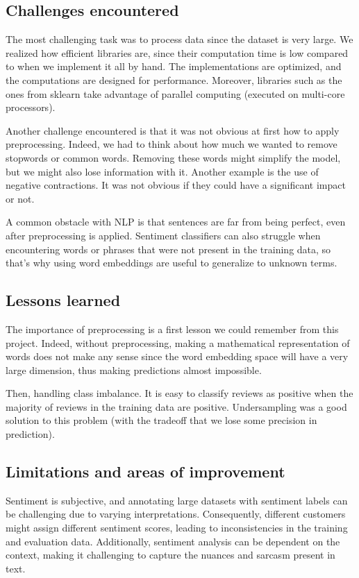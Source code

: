 \documentclass{article}
\begin{document}
\subsection{Challenges encountered}

The most challenging task was to process data since the dataset is very large. We realized how efficient libraries are, since their computation time is low compared to when we implement it all by hand.
The implementations are optimized, and the computations are designed for performance. Moreover, libraries such as the ones from sklearn take advantage of parallel computing (executed on multi-core processors). 

Another challenge encountered is that it was not obvious at first how to apply preprocessing. Indeed, we had to think about how much we wanted to remove stopwords or common words. Removing these words might simplify the model, but we might also lose information with it. Another example is the use of negative contractions. It was not obvious if they could have a significant impact or not.

A common obstacle with NLP is that sentences are far from being perfect, even after preprocessing is applied. Sentiment classifiers can also struggle when encountering words or phrases that were not present in the training data, so that's why using word embeddings are useful to generalize to unknown terms. 

\subsection{Lessons learned}

The importance of preprocessing is a first lesson we could remember from this project. Indeed, without preprocessing, making a mathematical representation of words does not make any sense since the word embedding space will have a very large dimension, thus making predictions almost impossible.

Then, handling class imbalance. It is easy to classify reviews as positive when the majority of reviews in the training data are positive. Undersampling was a good solution to this problem (with the tradeoff that we lose some precision in prediction). 

\subsection{Limitations and areas of improvement}

Sentiment is subjective, and annotating large datasets with sentiment labels can be challenging due to varying interpretations. Consequently, different customers might assign different sentiment scores, leading to inconsistencies in the training and evaluation data. Additionally, sentiment analysis can be dependent on the context, making it challenging to capture the nuances and sarcasm present in text. 
\end{document}
